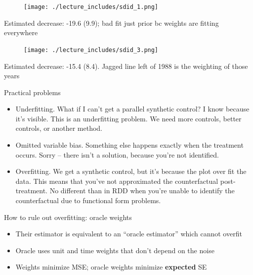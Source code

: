 \documentclass{beamer}
\begin{document}
\begin{frame}[plain]

	\begin{figure}
	\texttt{[image: ./lecture\_includes/sdid\_1.png]}
	\end{figure}

Estimated decrease: -19.6 (9.9); bad fit just prior bc weights are fitting everywhere

\end{frame}

\begin{frame}[plain]

	\begin{figure}
	\texttt{[image: ./lecture\_includes/sdid\_3.png]}
	\end{figure}
	
Estimated decrease: -15.4 (8.4). Jagged line left of 1988 is the weighting of those years 	

\end{frame}






\begin{frame}{Practical problems}


\begin{itemize}
\item Underfitting. What if I can't get a parallel synthetic control?  I know because it's visible. This is an underfitting problem.  We need more controls, better controls, or another method. 
\item Omitted variable bias.  Something else happens exactly when the treatment occurs.  Sorry -- there isn't a solution, because you're not identified. 
\item Overfitting. We get a synthetic control, but it's because the plot over fit the data. This means that you've not approximated the counterfactual post-treatment.  No different than in RDD when you're unable to identify the counterfactual due to functional form problems. 
\end{itemize}

\end{frame}

\begin{frame}{How to rule out overfitting: oracle weights}

\begin{itemize}
\item Their estimator is equivalent to an ``oracle estimator'' which cannot overfit
\item Oracle uses unit and time weights that don't depend on the noise
\item Weights minimize MSE; oracle weights minimize \textbf{expected} SE
\end{itemize}

\end{frame}
\end{document}
